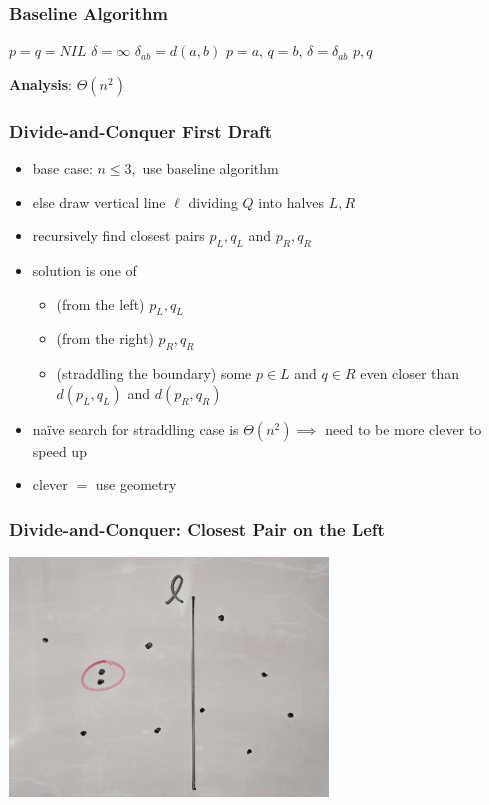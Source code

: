 \documentclass{beamer}
\begin{document}
\begin{frame} \frametitle{Baseline Algorithm}
  {\small
\begin{algorithmic}[1]
   
    \State $p = q = NIL$
    \State $\delta = \infty$
      \State $\delta_{ab} = d(a, b)$
        \State $p=a, \, q=b, \, \delta=\delta_{ab}$
      \EndIf
    \EndFor
    \State \Return $p, q$
  \EndFunction
\end{algorithmic}
}

\textbf{Analysis}: $\Theta(n^2)$
\end{frame}

\begin{frame} \frametitle{Divide-and-Conquer First Draft}
\begin{itemize}
  \item base case: $n \leq 3,$ use baseline algorithm
  \item else draw vertical line $\ell$ dividing $Q$ into halves $L, R$
  \item recursively find closest pairs $p_L, q_L$ and $p_R, q_R$
  \item solution is one of
  \begin{itemize}
    \item (from the left) $p_L, q_L$
    \item (from the right) $p_R, q_R$
    \item (straddling the boundary) some $p \in L$ and $q \in R$ even closer
      than $d(p_L, q_L)$ and $d(p_R, q_R)$
  \end{itemize}
  \item na\"{i}ve search for straddling case is $\Theta(n^2) \implies$ need to
    be more clever to speed up
  \item clever $=$ use geometry
\end{itemize}
\end{frame}

\begin{frame} \frametitle{Divide-and-Conquer: Closest Pair on the Left}
  \begin{center}
    \includegraphics[height=2.5in]{closest-pair-on-left.jpg}
  \end{center}
\end{frame}
\end{document}
